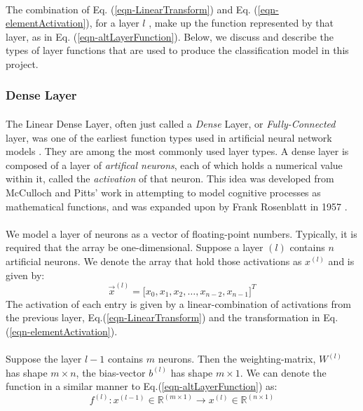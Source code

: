 \documentclass[12pt,letterpaper]{article}
\begin{document}
\paragraph*{}The combination of Eq. (\ref{eqn-LinearTransform}) and Eq. (\ref{eqn-elementActivation}), for a layer $l$ , make up the function represented by that layer, as in Eq. (\ref{eqn-altLayerFunction}). Below, we discuss and describe the types of layer functions that are used to produce the classification model in this project.


\subsubsection{Dense Layer}
\label{subsubsec-DenseLayer}

\paragraph*{}The Linear Dense Layer, often just called a \textit{Dense} Layer, or \textit{Fully-Connected} layer, was one of the earliest function types used in artificial neural network models \cite{Geron2,Loy,McCulloch}. They are among the most commonly used layer types. A dense layer is composed of a layer of \textit{artifical neurons}, each of which holds a numerical value within it, called the \textit{activation} of that neuron. This idea was developed from McCulloch and Pitts' work \cite{McCulloch} in attempting to model cognitive processes as mathematical functions, and was expanded upon by Frank Rosenblatt in  1957 \cite{Geron}.

\paragraph*{}We model a layer of neurons as a vector of floating-point numbers. Typically, it is required that the array be one-dimensional. Suppose a layer $(l)$ contains $n$ artificial neurons. We denote the array that hold those activations as $x^{(l)}$ and is given by:
\begin{equation}
\label{layer-DenseNeurons}
\vec{x}^{(l)} = \Big[ x_0, x_1, x_2, \hdots , x_{n-2}, x_{n-1} \Big]^T
\end{equation}
The activation of each entry is given by a linear-combination of activations from the previous layer, Eq.(\ref{eqn-LinearTransform}) and the transformation in Eq.(\ref{eqn-elementActivation}).

\paragraph*{}Suppose the layer $l-1$ contains $m$ neurons. Then the weighting-matrix, $W^{(l)}$ has shape $m \times n$, the bias-vector $b^{(l)}$ has shape $m \times 1$. We can denote the function in a similar manner to Eq.(\ref{eqn-altLayerFunction}) as:
\begin{equation}
\label{eqn-FunctionDense}
f^{(l)} : x^{(l-1)} \in \mathbb{R}^{(m \times 1)} \rightarrow x^{(l)} \in \mathbb{R}^{(n \times 1)}
\end{equation}
\end{document}
